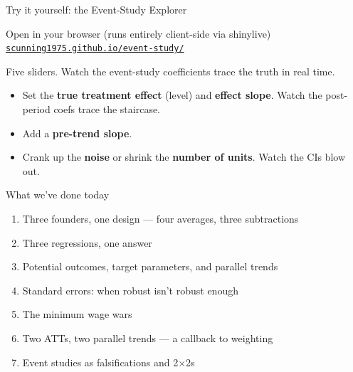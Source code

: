 \documentclass[aspectratio=169,11pt]{beamer}
\begin{document}
\begin{frame}{Try it yourself: the Event-Study Explorer}
\vspace{0.3em}
\begin{block}{Open in your browser (runs entirely client-side via shinylive)}
\centering
\href{https://scunning1975.github.io/event-study/}{\color{ocean}\texttt{scunning1975.github.io/event-study/}}
\end{block}
\vspace{0.4em}
Five sliders. Watch the event-study coefficients trace the truth in real time.
\vspace{0.4em}
\begin{itemize}\small
  \item Set the \textbf{true treatment effect} (level) and \textbf{effect slope}. Watch the post-period coefs trace the staircase.
  \item Add a \textbf{pre-trend slope}. \;
  \item Crank up the \textbf{noise} or shrink the \textbf{number of units}. \;Watch the CIs blow out.
\end{itemize}
\vspace{0.4em}
\end{frame}


\begin{frame}{What we've done today}
\vspace{0.3em}
\begin{enumerate}
  \item Three founders, one design --- four averages, three subtractions
  \item Three regressions, one answer
  \item Potential outcomes, target parameters, and parallel trends
  \item Standard errors: when robust isn't robust enough
  \item The minimum wage wars
  \item Two ATTs, two parallel trends --- a callback to weighting
  \item Event studies as falsifications and 2$\times$2s
\end{enumerate}
\end{frame}
\end{document}
